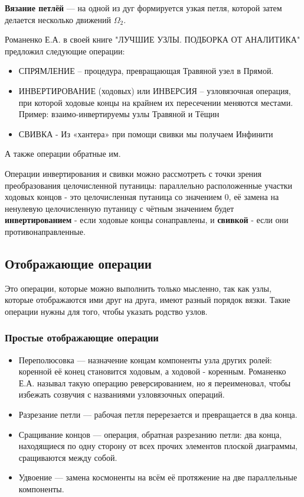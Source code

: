 \textbf{Вязание петлёй} --- на одной из дуг формируется узкая петля, которой затем делается несколько движений $\Omega_2$.

Романенко Е.А. в своей книге "ЛУЧШИЕ УЗЛЫ. ПОДБОРКА ОТ АНАЛИТИКА" предложил следующие операции:
\begin{itemize}
\item СПРЯМЛЕНИЕ – процедура, превращающая Травяной узел в Прямой. 
\item ИНВЕРТИРОВАНИЕ (ходовых) или ИНВЕРСИЯ – узловязочная операция, при которой ходовые концы на крайнем их пересечении меняются местами. Пример: взаимо-инвертируемы узлы Травяной и Тёщин 
\item СВИВКА - Из «хантера» при помощи свивки мы получаем Инфинити
\end{itemize}
А также операции обратные им.


Операции инвертирования и свивки можно рассмотреть с точки зрения преобразования целочисленной путаницы: параллельно расположенные участки ходовых концов - это целочисленная путаница со значением 0, её замена на ненулевую целочисленную путаницу с чётным значением будет \textbf{инвертированием} - если ходовые концы сонаправлены, и \textbf{свивкой} - если они противонаправленные.

\subsection{Отображающие операции}

Это операции, которые можно выполнить только мысленно, так как узлы, которые отображаются ими друг на друга, имеют разный порядок вязки. Такие операции нужны для того, чтобы указать родство узлов.

\subsubsection{Простые отображающие операции}
\begin{itemize}
\item Переполюсовка --- назначение концам компоненты узла других ролей: коренной её конец становится ходовым, а ходовой - коренным. Романенко Е.А. называл такую операцию реверсированием, но я переименовал, чтобы избежать созвучия с названиями узловязочных операций.
\item Разрезание петли --- рабочая петля перерезается и превращается в два конца.
\item Сращивание концов --- операция, обратная разрезанию петли: два конца, находящиеся по одну сторону от всех прочих элементов плоской диаграммы, сращиваются между собой.
\item Удвоение --- замена космоненты на всём её протяжение на две параллельные компоненты.
\end{itemize}

